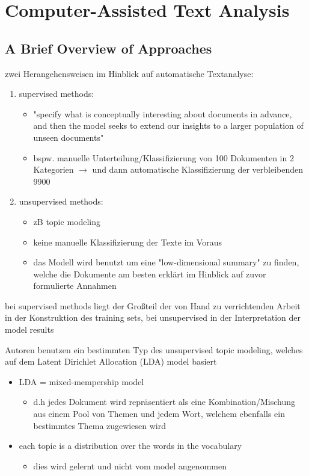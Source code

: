 \documentclass[11pt]{article}
\begin{document}
\section{Computer-Assisted Text Analysis}
\label{sec:orgd9f30c1}
\subsection{A Brief Overview of Approaches}
\label{sec:org4e91c23}
zwei Herangehensweisen im Hinblick auf automatische Textanalyse:
\begin{enumerate}
\item supervised methods:
\begin{itemize}
\item "specify what is conceptually interesting about documents in advance, and then the model seeks to extend our insights to a larger population of unseen documents"
\item bspw. manuelle Unterteilung/Klassifizierung von 100 Dokumenten in 2 Kategorien \(\rightarrow\) und dann automatische Klassifizierung der verbleibenden 9900
\end{itemize}
\item unsupervised methods:
\begin{itemize}
\item zB topic modeling
\item keine manuelle Klassifizierung der Texte im Voraus
\item das Modell wird benutzt um eine "low-dimensional summary" zu finden, welche die Dokumente am besten erklärt im Hinblick auf zuvor formulierte Annahmen
\end{itemize}
\end{enumerate}

bei supervised methods liegt der Großteil der von Hand zu verrichtenden Arbeit in der Konstruktion des training sets, bei unsupervised in der Interpretation der model results

Autoren benutzen ein bestimmten Typ des unsupervised topic modeling, welches auf dem Latent Dirichlet Allocation (LDA) model basiert
\begin{itemize}
\item LDA = mixed-mempership model
\begin{itemize}
\item d.h jedes Dokument wird repräsentiert als eine Kombination/Mischung aus einem Pool von Themen und jedem Wort, welchem ebenfalls ein bestimmtes Thema zugewiesen wird
\end{itemize}
\item each topic is a distribution over the words in the vocabulary
\begin{itemize}
\item dies wird gelernt und nicht vom model angenommen
\end{itemize}
\end{itemize}
\end{document}
